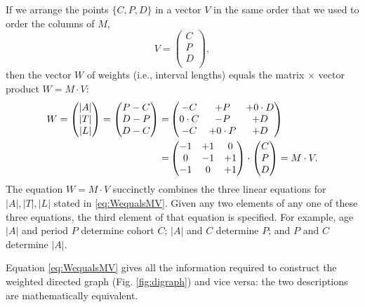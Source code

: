 \documentclass{bmcart}
\begin{document}
If we arrange the points $\{C,P,D\}$ in a vector $V$ in the same order that we used to order the columns of $M$,
\[
V =
\begin{pmatrix}
C \\
P \\
D \\
\end{pmatrix}
,\]
then the vector $W$ of weights (i.e., interval lengths) equals the matrix $\times$ vector product $W=M\cdot V$:
\begin{align}%
W =
\begin{pmatrix}
|A| \\
|T| \\
|L| \\
\end{pmatrix}
=
\begin{pmatrix}
P-C \\
D-P \\
D-C \\
\end{pmatrix}
=&
\begin{pmatrix}
 -C & +P & +0\cdot D \\
 0\cdot C & -P & +D \\
-C & +0\cdot P & +D \\
\end{pmatrix} \notag \\ 
 =&
\begin{pmatrix}
 -1 & +1 & 0 \\
 0 & -1 & +1 \\
 -1 & 0 & +1 \\
\end{pmatrix}
\cdot
\begin{pmatrix}
C \\
P \\
D \\
\end{pmatrix}
= M\cdot V.\label{eq:WequalsMV}%
\end{align}
The equation $W=M\cdot V$ succinctly combines the three linear equations for $|A|,|T|,|L|$ stated 
in \eqref{eq:WequalsMV}.
Given any two elements of any one of these three equations, the third element of that equation is specified. 
For example, age $|A|$ and period $P$ determine cohort $C$;
$|A|$ and $C$ determine $P$; and $P$ and $C$ determine $|A|$.

Equation \eqref{eq:WequalsMV} gives all the information required to construct the 
weighted directed graph (Fig. \ref{fig:digraph}) and vice versa: 
the two descriptions are mathematically equivalent.
\end{document}

